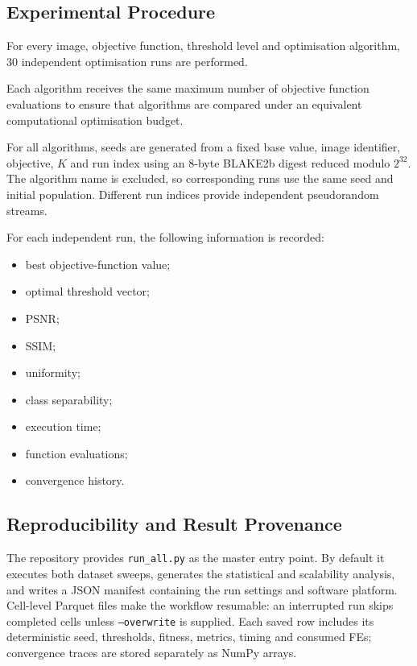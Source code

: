 \documentclass[review]{elsarticle}
\begin{document}
\subsection{Experimental Procedure}

For every image, objective function, threshold level and optimisation
algorithm, 30 independent optimisation runs are performed.

Each algorithm receives the same maximum number of objective function
evaluations to ensure that algorithms are compared under an equivalent
computational optimisation budget.

For all algorithms, seeds are generated from a fixed
base value, image identifier, objective, $K$ and run index using an
8-byte BLAKE2b digest reduced modulo $2^{32}$. The algorithm name is
excluded, so corresponding runs use the same seed and initial population.
Different run indices provide independent pseudorandom streams.

For each independent run, the following information is recorded:

\begin{itemize}
    \item best objective-function value;
    \item optimal threshold vector;
    \item PSNR;
    \item SSIM;
    \item uniformity;
    \item class separability;
    \item execution time;
    \item function evaluations;
    \item convergence history.
\end{itemize}

\subsection{Reproducibility and Result Provenance}

The repository provides \texttt{run\_all.py} as the master entry point. By
default it executes both dataset sweeps, generates the statistical and
scalability analysis, and writes a JSON manifest containing the run settings
and software platform. Cell-level Parquet
files make the workflow resumable: an interrupted run skips completed cells
unless \texttt{--overwrite} is supplied. Each saved row includes its
deterministic seed, thresholds, fitness, metrics, timing and consumed FEs;
convergence traces are stored separately as NumPy arrays.
\end{document}
